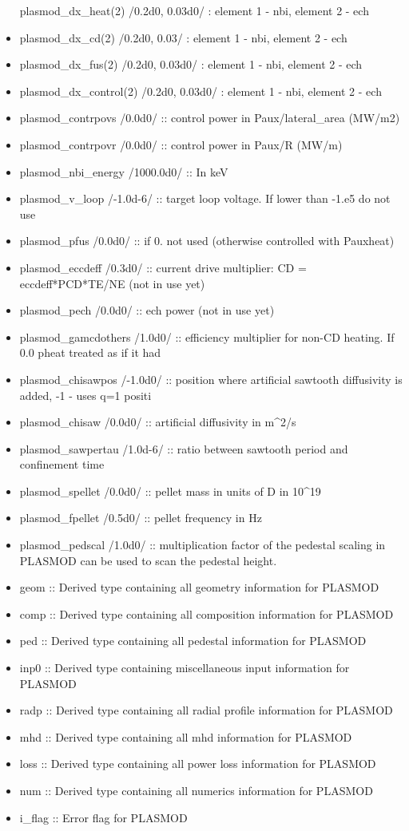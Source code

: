 \documentclass[]{article}
\begin{document}
\begin{itemize}
  plasmod\_dx\_heat(2) /0.2d0, 0.03d0/ : element 1 - nbi, element 2 -
  ech
\item
  plasmod\_dx\_cd(2) /0.2d0, 0.03/ : element 1 - nbi, element 2 - ech
\item
  plasmod\_dx\_fus(2) /0.2d0, 0.03d0/ : element 1 - nbi, element 2 - ech
\item
  plasmod\_dx\_control(2) /0.2d0, 0.03d0/ : element 1 - nbi, element 2 -
  ech
\item
  plasmod\_contrpovs /0.0d0/ :: control power in Paux/lateral\_area
  (MW/m2)
\item
  plasmod\_contrpovr /0.0d0/ :: control power in Paux/R (MW/m)
\item
  plasmod\_nbi\_energy /1000.0d0/ :: In keV
\item
  plasmod\_v\_loop /-1.0d-6/ :: target loop voltage. If lower than -1.e5
  do not use
\item
  plasmod\_pfus /0.0d0/ :: if 0. not used (otherwise controlled with
  Pauxheat)
\item
  plasmod\_eccdeff /0.3d0/ :: current drive multiplier: CD =
  eccdeff*PCD*TE/NE (not in use yet)
\item
  plasmod\_pech /0.0d0/ :: ech power (not in use yet)
\item
  plasmod\_gamcdothers /1.0d0/ :: efficiency multiplier for non-CD
  heating. If 0.0 pheat treated as if it had
\item
  plasmod\_chisawpos /-1.0d0/ :: position where artificial sawtooth
  diffusivity is added, -1 - uses q=1 positi
\item
  plasmod\_chisaw /0.0d0/ :: artificial diffusivity in m\^{}2/s
\item
  plasmod\_sawpertau /1.0d-6/ :: ratio between sawtooth period and
  confinement time
\item
  plasmod\_spellet /0.0d0/ :: pellet mass in units of D in 10\^{}19
\item
  plasmod\_fpellet /0.5d0/ :: pellet frequency in Hz
\item
  plasmod\_pedscal /1.0d0/ :: multiplication factor of the pedestal
  scaling in PLASMOD can be used to scan the pedestal height.
\item
  geom :: Derived type containing all geometry information for PLASMOD
\item
  comp :: Derived type containing all composition information for
  PLASMOD
\item
  ped :: Derived type containing all pedestal information for PLASMOD
\item
  inp0 :: Derived type containing miscellaneous input information for
  PLASMOD
\item
  radp :: Derived type containing all radial profile information for
  PLASMOD
\item
  mhd :: Derived type containing all mhd information for PLASMOD
\item
  loss :: Derived type containing all power loss information for PLASMOD
\item
  num :: Derived type containing all numerics information for PLASMOD
\item
  i\_flag :: Error flag for PLASMOD
\end{itemize}
\end{document}
